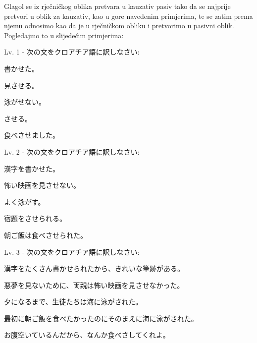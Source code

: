 	Glagol se iz rječničkog oblika pretvara u kauzativ pasiv tako da se najprije pretvori u oblik za kauzativ, kao u gore navedenim primjerima, te se zatim prema njemu odnosimo kao da je u rječničkom obliku i pretvorimo u pasivni oblik. Pogledajmo to u slijedećim primjerima:\\
 
	\begin{reibun}
	\end{reibun}

	\newpage		
		
	\begin{mondai}{Lv. 1 - 次の文をクロアチア語に訳しなさい: }
		\item 書かせた。
		\item 見させる。
		\item 泳がせない。
		\item させる。
		\item 食べさせました。
	\end{mondai}
		
	\begin{mondai}{Lv. 2 - 次の文をクロアチア語に訳しなさい: }
		\item 漢字を書かせた。
		\item 怖い映画を見させない。
		\item よく泳がす。
		\item 宿題をさせられる。
		\item 朝ご飯は食べさせられた。
	\end{mondai}
	
	\begin{mondai}{Lv. 3 - 次の文をクロアチア語に訳しなさい: }
		\item 漢字をたくさん書かせられたから、きれいな筆跡がある。
		\item 悪夢を見ないために、両親は怖い映画を見させなかった。
		\item 夕になるまで、生徒たちは海に泳がされた。
		\item 最初に朝ご飯を食べたかったのにそのまえに海に泳がされた。
		\item お腹空いているんだから、なんか食べさしてくれよ。\footnotemark[1]
	\end{mondai}

